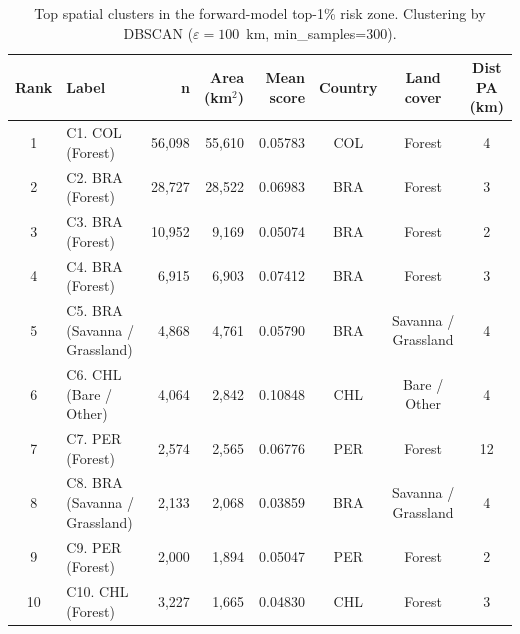 \begin{table}[htbp]
  \centering
  \small
  \caption{Top spatial clusters in the forward-model top-1\% risk zone.
   Clustering by DBSCAN ($\varepsilon=100$~km, min\_samples=300).}
  \label{tab:spatial_clusters}
  \begin{tabular}{clrrrccc}
    \toprule
    Rank & Label & n & Area (km$^2$) & Mean score & Country & Land cover & Dist PA (km) \\
    \midrule
    1 & C1. COL (Forest) & 56,098 & 55,610 & 0.05783 & COL & Forest & 4 \\
    2 & C2. BRA (Forest) & 28,727 & 28,522 & 0.06983 & BRA & Forest & 3 \\
    3 & C3. BRA (Forest) & 10,952 & 9,169 & 0.05074 & BRA & Forest & 2 \\
    4 & C4. BRA (Forest) & 6,915 & 6,903 & 0.07412 & BRA & Forest & 3 \\
    5 & C5. BRA (Savanna / Grassland) & 4,868 & 4,761 & 0.05790 & BRA & Savanna / Grassland & 4 \\
    6 & C6. CHL (Bare / Other) & 4,064 & 2,842 & 0.10848 & CHL & Bare / Other & 4 \\
    7 & C7. PER (Forest) & 2,574 & 2,565 & 0.06776 & PER & Forest & 12 \\
    8 & C8. BRA (Savanna / Grassland) & 2,133 & 2,068 & 0.03859 & BRA & Savanna / Grassland & 4 \\
    9 & C9. PER (Forest) & 2,000 & 1,894 & 0.05047 & PER & Forest & 2 \\
    10 & C10. CHL (Forest) & 3,227 & 1,665 & 0.04830 & CHL & Forest & 3 \\
    \bottomrule
  \end{tabular}
\end{table}
